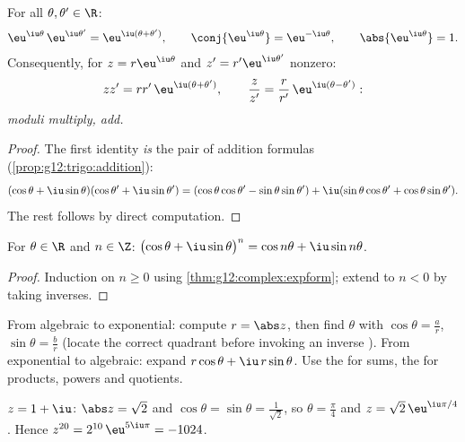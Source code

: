 \begin{theorem}\label{thm:g12:complex:expform}
For all $\theta, \theta' \in \R$:
\[
\eu^{\iu\theta}\,\eu^{\iu\theta'} = \eu^{\iu(\theta + \theta')},
\qquad
\conj{\eu^{\iu\theta}} = \eu^{-\iu\theta},
\qquad
\abs{\eu^{\iu\theta}} = 1 .
\]
Consequently, for $z = r\eu^{\iu\theta}$ and $z' = r'\eu^{\iu\theta'}$
nonzero:
\[
zz' = rr'\,\eu^{\iu(\theta+\theta')},
\qquad
\frac{z}{z'} = \frac{r}{r'}\,\eu^{\iu(\theta - \theta')} :
\]
\emph{moduli multiply,  add.}
\end{theorem}

\begin{proof}
The first identity \emph{is} the pair of addition formulas
(\cref{prop:g12:trigo:addition}):
\[
(\cos\theta + \iu\sin\theta)(\cos\theta' + \iu\sin\theta')
= (\cos\theta\cos\theta' - \sin\theta\sin\theta')
+ \iu(\sin\theta\cos\theta' + \cos\theta\sin\theta').
\]
The rest follows by direct computation.
\end{proof}

\begin{corollary}\label{cor:g12:complex:demoivre}
For $\theta \in \R$ and $n \in \Z$:
$\bigl(\cos\theta + \iu\sin\theta\bigr)^n = \cos n\theta + \iu \sin n\theta$.
\end{corollary}

\begin{proof}
Induction on $n \geq 0$ using \cref{thm:g12:complex:expform}; extend to
$n < 0$ by taking inverses.
\end{proof}

\begin{method}\label{met:g12:complex:forms}
From algebraic to exponential: compute $r = \abs z$, then find $\theta$ with
$\cos\theta = \frac ar$, $\sin\theta = \frac br$ (locate the correct quadrant
before invoking an inverse ). From exponential to algebraic: expand
$r\cos\theta + \iu\, r\sin\theta$. Use the  for sums, the
 for products, powers and quotients.
\end{method}

\begin{example}
$z = 1 + \iu$: $\abs z = \sqrt2$ and $\cos\theta = \sin\theta =
\frac{1}{\sqrt2}$, so $\theta = \frac\pi4$ and $z = \sqrt2\,\eu^{\iu\pi/4}$.
Hence $z^{20} = 2^{10}\,\eu^{5\iu\pi} = -1024$.
\end{example}

